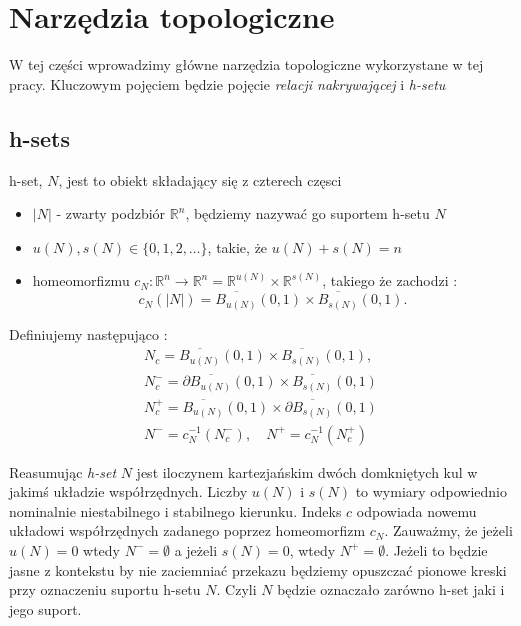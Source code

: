 
\section{Narzędzia topologiczne}
\label{sec:topmeth}

W tej części wprowadzimy główne narzędzia topologiczne wykorzystane w tej pracy.
Kluczowym pojęciem będzie pojęcie {\em relacji nakrywającej } i {\em h-setu} \cite{ZGi}

\subsection{h-sets}



\begin{definition} \cite{ZGi}
\label{def:covrel} h-set, $N$, jest to obiekt składający się z czterech
częsci
\begin{itemize}
 \item $|N|$  - zwarty podzbiór ${\mathbb R}^n$, będziemy nazywać go suportem h-setu $N$ %
 \item $u(N),s(N) \in \{0,1,2,\dots\}$, takie, że $u(N) + s(N) = n$ %
 \item homeomorfizmu $c_N:{\mathbb R}^n \to   
   {\mathbb R}^n={\mathbb R}^{u(N)} \times {\mathbb R}^{s(N)}$,
	 takiego że zachodzi : %
      \begin{displaymath}
        c_N(|N|)=\overline{B_{u(N)}}(0,1) \times
        \overline{B_{s(N)}}(0,1).
      \end{displaymath}
\end{itemize}
Definiujemy następująco : 
\begin{eqnarray*}
  N_c=\overline{B_{u(N)}}(0,1) \times \overline{B_{s(N)}}(0,1), \\
   N_c^-=\partial \overline{ B_{u(N)}}(0,1) \times
\overline{B_{s(N)}}(0,1) \\
N_c^+=\overline{B_{u(N)}}(0,1) \times
\partial \overline{B_{s(N)}}(0,1) \\
  N^-=c_N^{-1}(N_c^-) , \quad N^+=c_N^{-1}(N_c^+)
\end{eqnarray*}
\end{definition}

Reasumując {\em h-set }  $N$ jest iloczynem kartezjańskim dwóch domkniętych kul w jakimś
układzie współrzędnych. Liczby $u(N)$ i $s(N)$ to wymiary odpowiednio nominalnie niestabilnego
i stabilnego kierunku. Indeks $c$ odpowiada nowemu układowi współrzędnych zadanego poprzez homeomorfizm
$c_N$. Zauważmy, że jeżeli $u(N) = 0$ wtedy $N^-=\emptyset$ a jeżeli $s(N)=0$, wtedy $N^+=\emptyset$.
Jeżeli to będzie jasne z kontekstu by nie zaciemniać przekazu będziemy opuszczać pionowe kreski
przy oznaczeniu suportu h-setu $N$. Czyli $N$ będzie oznaczało zarówno h-set jaki i jego suport.

